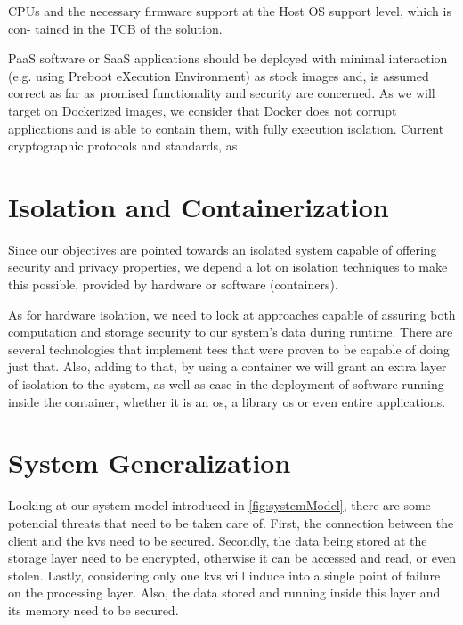 CPUs and the necessary firmware support at the Host OS support level, which is con-
tained in the TCB of the solution.

PaaS software or SaaS applications should be deployed with minimal interaction (e.g.
using Preboot eXecution Environment) as stock images and, is assumed correct as far
as promised functionality and security are concerned. As we will target on Dockerized
images, we consider that Docker does not corrupt applications and is able to contain
them, with fully execution isolation. Current cryptographic protocols and standards, as


\section{Isolation and Containerization} %
\label{sec:importing_images}

Since our objectives are pointed towards an isolated system capable of offering security and privacy properties, we depend a lot on isolation techniques to make this possible, provided by hardware or software (containers). 

As for hardware isolation, we need to look at approaches capable of assuring both computation and storage security to our system's data during runtime. There are several technologies that implement \gls{tee}s that were proven to be capable of doing just that.
Also, adding to that, by using a container we will grant an extra layer of isolation to the system, as well as ease in the deployment of software running inside the container, whether it is an \gls{os}, a library \gls{os} or even entire applications.


\section{System Generalization} %

Looking at our system model introduced in \ref{fig:systemModel}, there are some potencial threats that need to be taken care of. 
First, the connection between the client and the \gls{kvs} need to be secured. Secondly, the data being stored at the storage layer need to be encrypted, otherwise it can be accessed and read, or even stolen. Lastly, considering only one \gls{kvs} will induce into a single point of failure on the processing layer. Also, the data stored and running inside this layer and its memory need to be secured.

